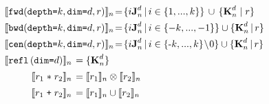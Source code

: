 \begin{align*}
%
%
\setlength{\arraycolsep}{0.2em}
\def\arraystretch{1.4}
\hspace{-0.2em}
\begin{array}{rl}
\multicolumn{2}{l}{\interp{\stenFwdSR{k}{d}{r}}_n\!=\!
 \{i\singleEntry{d}{n} \,|\, i \in \{1, ..., k\} \} \, \cup \, \{
                             \zeroEntry{d}{n} \mid r \}} \\
\multicolumn{2}{l}{\interp{\stenBwdSR{k}{d}{r}}_n\!=\!\{i\singleEntry{d}{n} \,|\, i \in \{-k, ..., -1\} \} \cup \{
  \zeroEntry{d}{n} \,|\, r \}} \\
\multicolumn{2}{l}{
\interp{\stenCenSR{k}{d}{r}}_n\!=\!\{i\singleEntry{d}{n} \,|\, i \in \{\text{-}k,..., k\}\!\setminus\!0 \}
  \cup  \{ \zeroEntry{d}{n} \,|\, r \}} \\
\interp{\stenReflS{d}}_n & = \{ \zeroEntry{d}{n} \} \\
%
%
\interp{r_1 \; \texttt{$\ast$} \; r_2}_n &
= \interp{r_1}_n \otimes \interp{r_2}_n \\
%
%
\interp{r_1 \; \texttt{+} \; r_2}_n &
= \interp{r_1}_n \cup \interp{r_2}_n
\end{array}
\end{align*}
